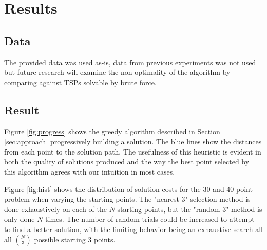 \documentclass{article}
\begin{document}
\section{Results}

\subsection{Data}
The provided data was used as-is, data from previous experiments was not used but future research will examine the
non-optimality of the algorithm by comparing against TSPs solvable by brute force.

\subsection{Result}
Figure \ref{fig:progress} shows the greedy algorithm described in Section \ref{sec:approach} progressively building a
solution. The blue lines show the distances from each point to the solution path. The usefulness of this heuristic is
evident in both the quality of solutions produced and the way the best point selected by this algorithm agrees with
our intuition in most cases.

Figure \ref{fig:hist} shows the distribution of solution costs for the 30 and 40 point problem when varying the starting
points. The "nearest 3" selection method is done exhaustively on each of the $N$ starting points, but the "random 3"
method is only done $N$ times. The number of random trials could be increased to attempt to find a better solution, with
the limiting behavior being an exhaustive search all all $N \choose 3$ possible starting 3 points. 

\end{document}
